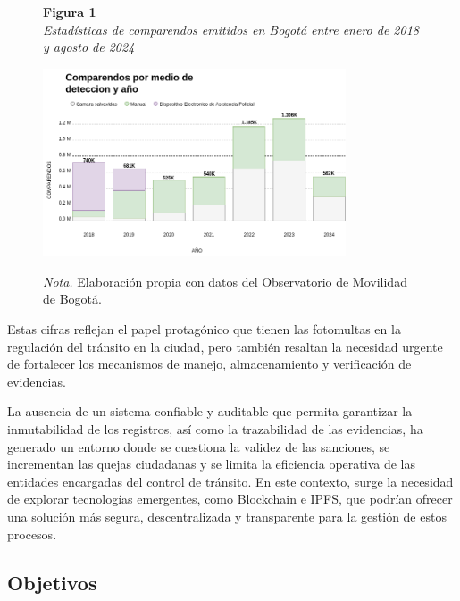 \begin{figure}[htbp]
    \begin{flushleft}
        \textbf{Figura 1}\\[2em]
        \textit{Estadísticas de comparendos emitidos en Bogotá entre enero de 2018 y agosto de 2024}
    \end{flushleft}
    \vspace{1em}
    \centering
    \includegraphics[width=0.8\textwidth]{Images/numComparendos.png}
    \vspace{2em}
    \begin{flushleft}
        \textit{Nota.} Elaboración propia con datos del Observatorio de Movilidad de Bogotá.
    \end{flushleft}
    \label{fig:estadisticas_comparendos}
\end{figure}

Estas cifras reflejan el papel protagónico que tienen las fotomultas en la regulación del tránsito en la ciudad, pero también resaltan la necesidad urgente de fortalecer los mecanismos de manejo, almacenamiento y verificación de evidencias.  

La ausencia de un sistema confiable y auditable que permita garantizar la inmutabilidad de los registros, así como la trazabilidad de las evidencias, ha generado un entorno donde se cuestiona la validez de las sanciones, se incrementan las quejas ciudadanas y se limita la eficiencia operativa de las entidades encargadas del control de tránsito. En este contexto, surge la necesidad de explorar tecnologías emergentes, como Blockchain e IPFS, que podrían ofrecer una solución más segura, descentralizada y transparente para la gestión de estos procesos. 

\subsection{Objetivos}
